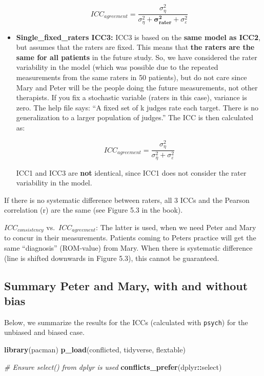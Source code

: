 \documentclass[
]{book}
\newenvironment{Shaded}{\begin{snugshade}}{\end{snugshade}}
\newcommand{\CommentTok}[1]{\textcolor[rgb]{0.56,0.35,0.01}{\textit{#1}}}
\newcommand{\FunctionTok}[1]{\textcolor[rgb]{0.13,0.29,0.53}{\textbf{#1}}}
\newcommand{\NormalTok}[1]{#1}
\newcommand{\SpecialCharTok}[1]{\textcolor[rgb]{0.81,0.36,0.00}{\textbf{#1}}}
\begin{document}
\begin{itemize}
  \[ ICC_{agreement} = \frac{\sigma_{\eta}^2}{\sigma_{\eta}^2 +\mathbf{\sigma_{rater}^2} + 
  \sigma_{\varepsilon}^2}\]
\item
  \textbf{Single\_fixed\_raters ICC3:}
  ICC3 is based on the \textbf{same model as ICC2}, but assumes that the raters are fixed.
  This means that \textbf{the raters are the same for all patients} in the future study.
  So, we have considered the rater variability in the model
  (which was possible due to the repeated measurements from the same raters in 50 patients),
  but do not care since Mary and Peter will be the people doing the future
  measurements, not other therapists. If you fix a stochastic variable
  (raters in this case), variance is zero. The help file says:
  ``A fixed set of k judges rate each target.
  There is no generalization to a larger population of judges.''
  The ICC is then calculated as:

  \[ ICC_{agreement} = \frac{\sigma_{\eta}^2}{\sigma_{\eta}^2 + \sigma_{\varepsilon}^2}\]

  ICC1 and ICC3 are \textbf{not} identical, since ICC1 does not consider the rater variability
  in the model.
\end{itemize}

If there is no systematic difference between raters, all 3 ICCs and the Pearson
correlation (r) are the same (see Figure 5.3 in the book).

\(ICC_{consistency}\) vs.~\(ICC_{agreement}\):
The latter is used, when we need Peter and Mary to concur in their measurements.
Patients coming to Peters practice will get the same ``diagnosis'' (ROM-value)
from Mary. When there is systematic difference (line is shifted downwards in Figure 5.3),
this cannot be guaranteed.

\subsection{Summary Peter and Mary, with and without bias}\label{summary-peter-and-mary-with-and-without-bias}

Below, we summarize the results for the ICCs (calculated with \texttt{psych})
for the unbiased and biased case.

\begin{Shaded}
\begin{Highlighting}[]
\FunctionTok{library}\NormalTok{(pacman)}
\FunctionTok{p\_load}\NormalTok{(conflicted, tidyverse, flextable)}

\CommentTok{\# Ensure select() from dplyr is used}
\FunctionTok{conflicts\_prefer}\NormalTok{(dplyr}\SpecialCharTok{::}\NormalTok{select)}
\end{Highlighting}
\end{Shaded}
\end{document}
